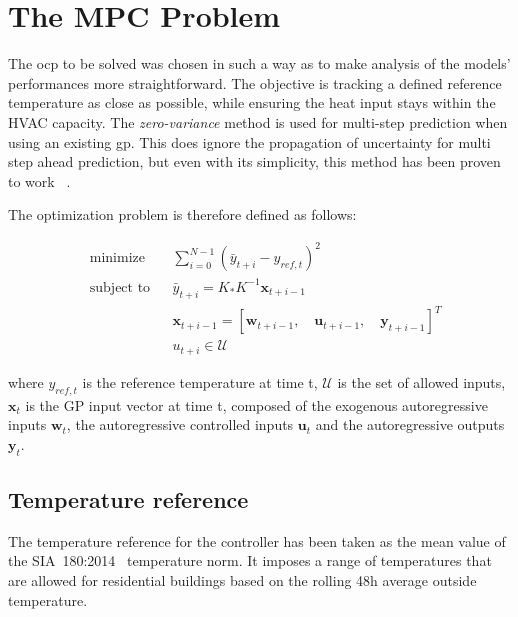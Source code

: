 \section{The MPC Problem}\label{sec:mpc_problem}

The \acrlong{ocp} to be solved was chosen in such a way as to make
analysis of the models' performances more straightforward. The objective is
tracking a defined reference temperature as close as possible, while ensuring
the heat input stays within the HVAC capacity. The \textit{zero-variance} method
is used for multi-step prediction when using an existing \acrshort{gp}. This
does ignore the propagation of uncertainty for multi step ahead prediction, but
even with its simplicity, this method has been proven to work
~\cite{kocijanModellingControlDynamic2016,jainLearningControlUsing2018,
pleweSupervisoryModelPredictive2020}.

The optimization problem is therefore defined as follows:

\begin{subequations}\label{eq:optimal_control_problem}
    \begin{align}
        & \text{minimize}
        & & \sum_{i=0}^{N-1} (\bar{y}_{t+i} - y_{ref, t})^2 \\
        & \text{subject to}
        & & \bar{y}_{t+i} = K_*K^{-1}\mathbf{x}_{t+i-1} \\
        &&& \mathbf{x}_{t+i-1} = \left[\mathbf{w}_{t+i-1},\quad
        \mathbf{u}_{t+i-1},\quad \mathbf{y}_{t+i-1}\right]^T \\
        \label{eq:components}
        &&& u_{t+i} \in \mathcal{U}
    \end{align}
\end{subequations}

where $y_{ref, t}$ is the reference temperature at time t, $\mathcal{U}$ is the
set of allowed inputs, $\mathbf{x}_{t}$ is the GP input vector at time t,
composed of the exogenous autoregressive inputs $\mathbf{w}_{t}$, the
autoregressive controlled inputs $\mathbf{u}_{t}$ and the autoregressive outputs
$\mathbf{y}_{t}$.

\subsection{Temperature reference}\label{sec:reference_temperature}

The temperature reference for the controller has been taken as the mean value of
the SIA~180:2014~\cite{sia180:2014ProtectionThermiqueProtection2014} temperature
norm. It imposes a range of temperatures that are allowed for residential
buildings based on the rolling 48h average outside temperature.


